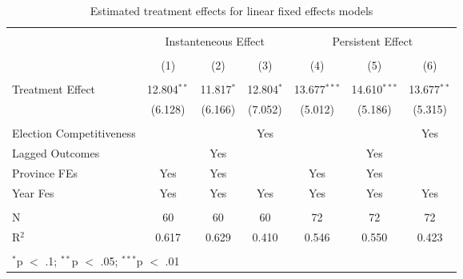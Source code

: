 
\begin{table}[!htbp] \centering 
  \caption{Estimated treatment effects for linear fixed effects models} 
  \label{res:lfe} 
\begin{tabular}{@{\extracolsep{5pt}}lcccccc} 
\\[-1.8ex]\hline 
\hline \\[-1.8ex] 
 & \multicolumn{3}{c}{Instanteneous Effect} & \multicolumn{3}{c}{Persistent Effect} \\ 
\\[-1.8ex] & (1) & (2) & (3) & (4) & (5) & (6)\\ 
\hline \\[-1.8ex] 
 Treatment Effect & 12.804$^{**}$ & 11.817$^{*}$ & 12.804$^{*}$ & 13.677$^{***}$ & 14.610$^{***}$ & 13.677$^{**}$ \\ 
  & (6.128) & (6.166) & (7.052) & (5.012) & (5.186) & (5.315) \\ 
 \hline \\[-1.8ex] 
Election Competitiveness &  &  & Yes &  &  & Yes \\ 
Lagged Outcomes &  & Yes &  &  & Yes &  \\ 
Province FEs & Yes & Yes &  & Yes & Yes &  \\ 
Year Fes & Yes & Yes & Yes & Yes & Yes & Yes \\ 
\hline \\[-1.8ex] 
N & 60 & 60 & 60 & 72 & 72 & 72 \\ 
R$^{2}$ & 0.617 & 0.629 & 0.410 & 0.546 & 0.550 & 0.423 \\ 
\hline 
\hline \\[-1.8ex] 
\multicolumn{7}{l}{$^{*}$p $<$ .1; $^{**}$p $<$ .05; $^{***}$p $<$ .01} \\ 
\end{tabular} 
\end{table} 
